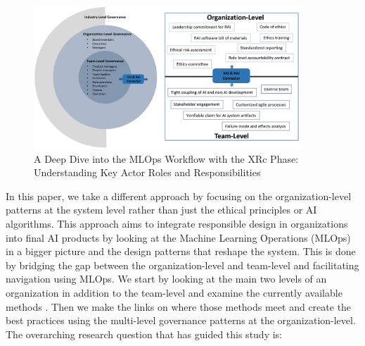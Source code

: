 \documentclass[conference]{IEEEtran}
\begin{document}
\begin{figure}[htbp!!]
	\centering
	\includegraphics[width=0.9\textwidth]{Organization.png}
	\caption{A Deep Dive into the MLOps Workflow with the XRc Phase: Understanding Key Actor Roles and Responsibilities}
	\label{XAIRAIorg}
\end{figure}
In this paper, we take a different approach by focusing on the organization-level patterns at the system level rather than just the ethical principles or AI algorithms. This approach aims to integrate responsible design in organizations into final AI products by looking at the Machine Learning Operations (MLOps) in a bigger picture and the design patterns that reshape the system. This is done by bridging the gap between the organization-level and team-level and facilitating navigation using MLOps. We start by looking at the main two levels of an organization in addition to the team-level and examine the currently available methods \cite{Shneiderman, ShneidermanRespo, Jana, Hussain, roadmap}. Then we make the links on where those methods meet and create the best practices using the multi-level governance patterns at the organization-level. The overarching research question that has guided this study is:


\vskip 0.1in
\vskip 0.1in

\noindent{}

\vskip 0.1in
\vskip 0.1in
\end{document}
